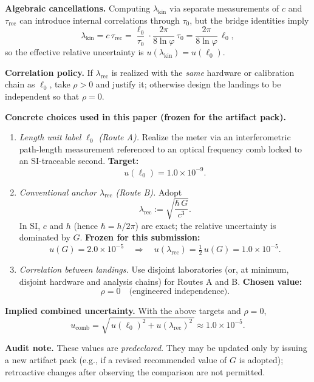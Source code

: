 \documentclass[11pt]{article}
\begin{document}
\begin{remark}
\textbf{Algebraic cancellations.} Computing \(\lambda_{\mathrm{kin}}\) via separate measurements of \(c\) and \(\tau_{\mathrm{rec}}\) can introduce internal correlations through \(\tau_{0}\), but the bridge identities imply
\[
\lambda_{\mathrm{kin}}=c\,\tau_{\mathrm{rec}}=\frac{\ell_{0}}{\tau_{0}}\cdot\frac{2\pi}{8\ln\varphi}\,\tau_{0}=\frac{2\pi}{8\ln\varphi}\,\ell_{0},
\]
so the effective relative uncertainty is \(u(\lambda_{\mathrm{kin}})=u(\ell_{0})\).

\textbf{Correlation policy.} If \(\lambda_{\mathrm{rec}}\) is realized with the \emph{same} hardware or calibration chain as \(\ell_{0}\), take \(\rho>0\) and justify it; otherwise design the landings to be independent so that \(\rho=0\).

\medskip
\noindent\textbf{Concrete choices used in this paper (frozen for the artifact pack).}
\begin{enumerate}
  \item \emph{Length unit label \(\ell_{0}\) (Route A).} Realize the meter via an interferometric path-length measurement referenced to an optical frequency comb locked to an SI-traceable second. \textbf{Target:}
  \[
  u(\ell_{0})=1.0\times10^{-9}.
  \]
  \item \emph{Conventional anchor \(\lambda_{\mathrm{rec}}\) (Route B).} Adopt
  \[
  \lambda_{\mathrm{rec}}:=\sqrt{\frac{\hbar\,G}{c^{3}}}.
  \]
  In SI, \(c\) and \(h\) (hence \(\hbar=h/2\pi\)) are exact; the relative uncertainty is dominated by \(G\). \textbf{Frozen for this submission:}
  \[
  u(G)=2.0\times10^{-5}\quad\Longrightarrow\quad u(\lambda_{\mathrm{rec}})=\tfrac12\,u(G)=1.0\times10^{-5}.
  \]
  \item \emph{Correlation between landings.} Use disjoint laboratories (or, at minimum, disjoint hardware and analysis chains) for Routes A and B. \textbf{Chosen value:}
  \[
  \rho=0\quad\text{(engineered independence)}.
  \]
\end{enumerate}

\textbf{Implied combined uncertainty.} With the above targets and \(\rho=0\),
\[
u_{\mathrm{comb}}=\sqrt{\,u(\ell_{0})^{2}+u(\lambda_{\mathrm{rec}})^{2}\,}\approx 1.0\times10^{-5}.
\]

\textbf{Audit note.} These values are \emph{predeclared}. They may be updated only by issuing a new artifact pack (e.g., if a revised recommended value of \(G\) is adopted); retroactive changes after observing the comparison are not permitted.
\end{remark}
\end{document}
